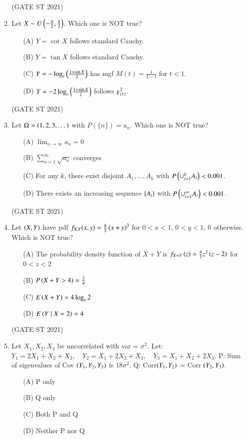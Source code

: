 \documentclass[journal,12pt,onecolumn]{IEEEtran}
\theoremstyle{remark}
\begin{document}
\begin{enumerate}
\hfill (GATE ST 2021) \\
\item
Let $
X \sim U\left(-\frac{\pi}{2}, \frac{\pi}{2}\right)$. Which one is NOT true?
\begin{enumerate}
\item[(A)] $Y = \cot X$ follows standard Cauchy.
\item[(B)] $Y = \tan X$ follows standard Cauchy.
\item[(C)] $Y = -\log_e \left(\frac{1+ \sin X}{2}\right)$ has mgf $M(t) = \frac{1}{1-t}$ for $t<1$.
\item[(D)] $Y = -2\log_e\left( \frac{1 + \sin X}{2} \right)$ follows $\chi^2_{\left(1\right)}$.
\end{enumerate}

\hfill (GATE ST 2021) \\
\item
Let $\Omega = \left(1,2,3,\dots\right)$ with $P(\{n\}) = a_n$. Which one is NOT true?
\begin{enumerate}
\item[(A)] $\lim_{n\to\infty} a_n = 0$
\item[(B)] $\sum_{n=1}^\infty \sqrt{a_n}$ converges
\item[(C)] For any $k$, there exist disjoint $A_1, \dots, A_k$ with $P\left(\cup_{i=1}^k A_i\right) < 0.001$.
\item[(D)] There exists an increasing sequence $\left\{A_i\right\}$ with $P\left(\cup_{i=1}^\infty A_i\right) < 0.001$.
\end{enumerate}

\hfill (GATE ST 2021) \\
\item
Let $\left(X,Y\right)$ have pdf $f_{X,Y}(x,y) = \frac{4}{3}\left(x+y\right)^3$ for $0 < x < 1$, $0 < y < 1$, $0$ otherwise. Which is NOT true?
\begin{enumerate}
\item[(A)] The probability density function of $X+Y$ is $f_{X+Y}\left(z\right) = \frac{4}{3} z^3 \left(z-2\right)$ for $0<z<2$
\item[(B)] $P\left(X+Y > 4\right) = \frac{3}{4}$
\item[(C)] $E\left(X+Y\right) = 4 \log_e 2$
\item[(D)] $E\left(Y \mid X=2\right) = 4$
\end{enumerate}

\hfill (GATE ST 2021) \\
\item
Let $X_1, X_2, X_3$ be uncorrelated with var = $\sigma^2$. Let:
$
Y_1 = 2X_1 + X_2 + X_3,\quad Y_2 = X_1 + 2X_2 + X_3,\quad Y_3 = X_1 + X_2 + 2X_3.
$
P: Sum of eigenvalues of Cov $\left(Y_1,Y_2,Y_3\right)$ is $18\sigma^2$.  
Q: Corr$\left(Y_1,Y_2\right)$ = Corr $\left(Y_2,Y_3\right)$.
\begin{enumerate}
\item[(A)] P only
\item[(B)] Q only
\item[(C)] Both P and Q
\item[(D)] Neither P nor Q
\end{enumerate}


\end{enumerate}
\end{document}
